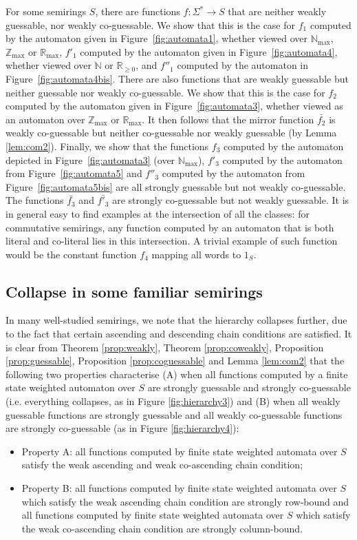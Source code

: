 \documentclass{lmcs}
\numberwithin{theorem}{section}
\begin{document}
For some semirings $S$, there are functions $f: \Sigma^* \rightarrow S$ that are neither weakly guessable, nor weakly co-guessable. We show that this is the case for $f_1$ computed by the automaton given in Figure~\ref{fig:automata1}, whether viewed over $\mathbb{N}_{\max}$, $\mathbb{Z}_{\max}$ or $\mathbb{R}_{\max}$, $f'_1$ computed by the automaton given in Figure~\ref{fig:automata4}, whether viewed over $\mathbb{N}$ or $\mathbb{R}_{\geq 0}$, and $f''_1$ computed by the automaton in Figure~\ref{fig:automata4bis}. There are also functions that are weakly guessable but neither guessable nor weakly co-guessable. We show that this is the case for $f_2$ computed by the automaton given in Figure~\ref{fig:automata3}, whether viewed as an automaton over $\mathbb{Z}_{\max}$ or $\mathbb{R}_{\max}$. It then follows that the mirror function $\bar{f_2}$ is weakly co-guessable but neither co-guessable nor weakly guessable (by Lemma \ref{lem:com2}). Finally, we show that the functions $f_3$ computed by the automaton depicted in Figure~\ref{fig:automata3} (over $\mathbb{N}_{\max}$), $f'_3$ computed by the automaton from Figure~\ref{fig:automata5} and $f''_3$ computed by the automaton from Figure~\ref{fig:automata5bis} are all strongly guessable but not weakly co-guessable. The functions $\bar{f_3}$ and $\bar{f'_3}$ are strongly co-guessable but not weakly guessable. 
It is in general easy to find examples at the intersection of all the classes: for commutative semirings, any function computed by an automaton that is both literal and co-literal lies in this intersection. A trivial example of such function would be the constant function $f_4$ mapping all words to $1_S$.

\subsection{Collapse in some familiar semirings}
In many well-studied semirings, we note that the hierarchy collapses further, due to the fact that certain ascending and descending chain conditions are satisfied. It is clear from Theorem \ref{prop:weakly}, Theorem \ref{prop:coweakly}, Proposition \ref{prop:guessable}, Proposition \ref{prop:coguessable} and Lemma \ref{lem:com2} that the following two properties characterise (A) when all functions computed by a finite state weighted automaton over $S$ are strongly guessable and strongly co-guessable (i.e. everything collapses, as in Figure \ref{fig:hierarchy3}) and (B) when all weakly guessable functions are strongly guessable and all weakly co-guessable functions are strongly co-guessable (as in Figure \ref{fig:hierarchy4}):
\begin{itemize}
	\item Property A: all functions computed by finite state weighted automata over $S$ satisfy the weak ascending and weak co-ascending chain condition;
	\item Property B: all functions computed by finite state weighted automata over $S$ which satisfy the weak ascending chain condition are strongly row-bound and all functions computed by finite state weighted automata over $S$ which satisfy the weak co-ascending chain condition are strongly column-bound.
\end{itemize}
\end{document}
